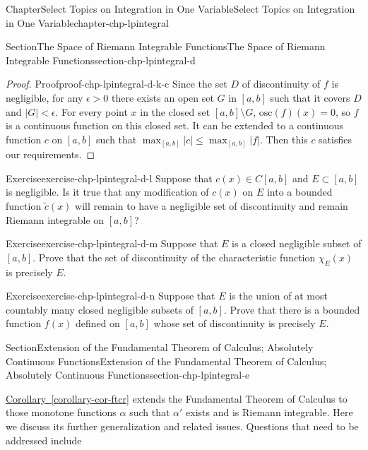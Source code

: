 \documentclass[oneside,10pt,]{book}
\newcommand{\xreffont}{\relax}
\numberwithin{equation}{section}
\newcommand{\osc}{\text{osc}}
\begin{document}
\begin{chapterptx}{Chapter}{Select Topics on Integration in One Variable}{}{Select Topics on Integration in One Variable}{}{}{chapter-chp-lpintegral}
\begin{sectionptx}{Section}{The Space of Riemann Integrable Functions}{}{The Space of Riemann Integrable Functions}{}{}{section-chp-lpintegral-d}
\begin{proof}{Proof}{}{proof-chp-lpintegral-d-k-c}
Since the set \(D\) of discontinuity of \(f\) is negligible, for any \(\epsilon > 0\) there exists  an open set \(G\) in \([a, b]\) such that it covers \(D\) and \(|G| < \epsilon\). For every point \(x\) in the closed set \([a, b]\setminus G\), \(\osc(f)(x)=0\), so \(f\) is a continuous function on this closed set.   It can be extended to a continuous function \(c\) on \([a, b]\) such that \(\max_{[a, b]}|c| \le \max_{[a,b]}|f|\). Then this \(c\) satisfies our requirements.\end{proof}
\begin{inlineexercise}{Exercise}{}{exercise-chp-lpintegral-d-l}%
Suppose that \(c(x)\in C[a, b]\) and \(E\subset [a, b]\) is negligible. Is it true that any modification of \(c(x)\) on \(E\) into a bounded  function \(\tilde c(x)\) will remain to have a negligible set of discontinuity and remain Riemann integrable on \([a, b]\)?%
\end{inlineexercise}%
\begin{inlineexercise}{Exercise}{}{exercise-chp-lpintegral-d-m}%
Suppose that \(E\) is a closed negligible subset of \([a, b]\). Prove that the set of discontinuity of the characteristic function \(\chi_{E}(x)\) is precisely \(E\).%
\end{inlineexercise}%
\begin{inlineexercise}{Exercise}{}{exercise-chp-lpintegral-d-n}%
Suppose that \(E\) is the union of at most countably many closed negligible subsets of \([a, b]\). Prove that there is a bounded function \(f(x)\) defined on \([a, b]\) whose set of discontinuity is precisely \(E\).%
\end{inlineexercise}%
\end{sectionptx}
%
%
\typeout{************************************************}
\typeout{************************************************}
%
\begin{sectionptx}{Section}{Extension of the Fundamental Theorem of Calculus; Absolutely Continuous Functions}{}{Extension of the Fundamental Theorem of Calculus; Absolutely Continuous Functions}{}{}{section-chp-lpintegral-e}
\begin{introduction}{}%
\hyperref[corollary-cor-ftcr]{Corollary~{\xreffont\ref{corollary-cor-ftcr}}} extends the Fundamental Theorem of Calculus to those monotone functions \(\alpha\) such that \(\alpha'\) exists and is Riemann integrable. Here we discuss its further generalization and related issues. Questions that need to be addressed include %

\end{introduction}
\end{sectionptx}
\end{chapterptx}
\end{document}
